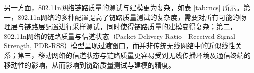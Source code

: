 另一方面，802.11n网络链路质量的测试与建模更为复杂，如表 \ref{tab:mcs} 所示。第一，802.11n网络的多种配置提高了链路质量测试的复杂度，需要对所有可能的物理层与链路层配置进行采样测试，同时使得链路质量的建模变得复杂；第二，802.11n网络的链路质量与信道状态（Packet Delivery Ratio - Received Signal Strength, PDR-RSS）模型呈现过渡窗口，而并非传统无线网络中的近似线性关系；第三，移动网络的信道状态与链路质量更容易受到无线传播环境及通信终端的移动性的影响，从而影响到链路质量测试与建模的精度。
%
%
%
%
%

